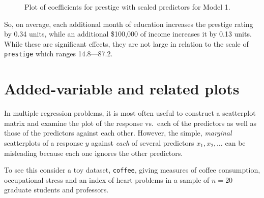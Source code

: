 \documentclass[
  letterpaper,
  10pt,
  krantz2]{krantz}
\begin{document}
{\begin{figure}[H]


\caption{\label{fig-ggcoef-compare2}Plot of coefficients for prestige
with scaled predictors for Model 1.}

\end{figure}%

So, on average, each additional month of education increases the
prestige rating by 0.34 units, while an additional \$100,000 of income
increases it by 0.13 units. While these are significant effects, they
are not large in relation to the scale of \texttt{prestige} which ranges
14.8---87.2.

\section{Added-variable and related plots}\label{sec-avplots}

In multiple regression problems, it is most often useful to construct a
scatterplot matrix and examine the plot of the response vs.~each of the
predictors as well as those of the predictors against each other.
However, the simple, \emph{marginal} scatterplots of a response \(y\)
against \emph{each} of several predictors \(x_1, x_2, \dots\) can be
misleading because each one ignores the other predictors.

To see this consider a toy dataset, \texttt{coffee}, giving measures of
coffee consumption, occupational stress and an index of heart problems
in a sample of \(n=20\) graduate students and professors.

}
\end{document}
